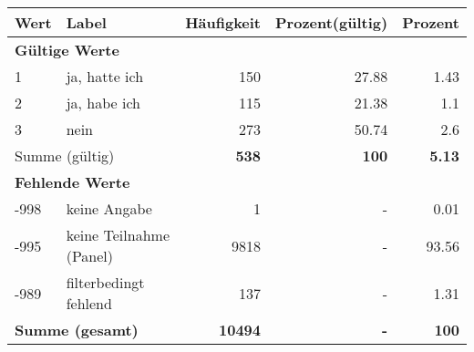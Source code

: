      \begin{longtable}{lXrrr}
     \toprule
     \textbf{Wert} & \textbf{Label} & \textbf{Häufigkeit} & \textbf{Prozent(gültig)} & \textbf{Prozent} \\
     \endhead
     \midrule
     \multicolumn{5}{l}{\textbf{Gültige Werte}}\\

     1 &
     \multicolumn{1}{X}{ ja, hatte ich   } &


       \num{150} &
       \num[round-mode=places,round-precision=2]{27,88} &
         \num[round-mode=places,round-precision=2]{1,43} \\

     2 &
     \multicolumn{1}{X}{ ja, habe ich   } &


       \num{115} &
       \num[round-mode=places,round-precision=2]{21,38} &
         \num[round-mode=places,round-precision=2]{1,1} \\

     3 &
     \multicolumn{1}{X}{ nein   } &


       \num{273} &
       \num[round-mode=places,round-precision=2]{50,74} &
         \num[round-mode=places,round-precision=2]{2,6} \\
     \midrule
     \multicolumn{2}{l}{Summe (gültig)} &
       \textbf{\num{538}} &
     \textbf{100} &
       \textbf{\num[round-mode=places,round-precision=2]{5,13}} \\
     \multicolumn{5}{l}{\textbf{Fehlende Werte}}\\
       -998 &
       keine Angabe &
         \num{1} &
        - &
         \num[round-mode=places,round-precision=2]{0,01} \\
       -995 &
       keine Teilnahme (Panel) &
         \num{9818} &
        - &
         \num[round-mode=places,round-precision=2]{93,56} \\
       -989 &
       filterbedingt fehlend &
         \num{137} &
        - &
         \num[round-mode=places,round-precision=2]{1,31} \\
     \midrule
     \multicolumn{2}{l}{\textbf{Summe (gesamt)}} &
          \textbf{\num{10494}} &
        \textbf{-} &
        \textbf{100} \\
     \bottomrule
     \end{longtable}
     
